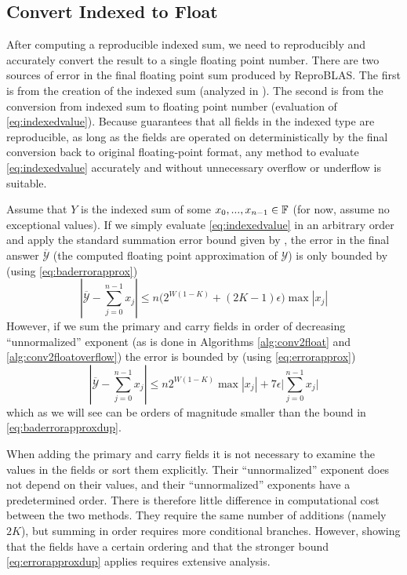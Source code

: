 \subsection{Convert Indexed to Float}
    \label{sec:primitiveops_conv2float}
    After computing a reproducible indexed sum, we need to reproducibly and
    accurately convert the result to a single floating point number. There
    are two sources of error in the final floating point sum
    produced by ReproBLAS. The first is from the creation of the indexed sum
    (analyzed in \cite{repsum}). The second is from the conversion from indexed
    sum to floating point number (evaluation of  \eqref{eq:indexedvalue}).
    Because \cite{repsum} guarantees that all fields in the indexed type are
    reproducible, as long as the fields are operated on deterministically
    by the final conversion back to original floating-point format,
    any method to evaluate  \eqref{eq:indexedvalue} accurately and without
    unnecessary overflow or underflow is suitable.

    Assume that $Y$ is the indexed sum of some $x_0, ..., x_{n - 1} \in \mathbb{F}$ (for now, assume no exceptional values). If
    we simply evaluate \eqref{eq:indexedvalue} in an arbitrary order and apply
    the standard summation error bound given by \cite{higham}, the error in the
    final answer $\overline{\mathcal{Y}}$ (the computed floating point
    approximation of $\mathcal{Y}$) is only bounded by (using
    \eqref{eq:baderrorapprox})
    \begin{equation}
      |\overline{\mathcal{Y}} - \sum_{j=0}^{n-1}x_j| \leq n \bigl(2^{W  (1 - K)} + (2  K - 1)  \epsilon\bigr)\max|x_j|
      \label{eq:baderrorapproxdup}
    \end{equation}
    However, if we sum the primary and carry fields in order of decreasing ``unnormalized''
    exponent (as is done in Algorithms \ref{alg:conv2float} and \ref{alg:conv2floatoverflow}) the error is bounded by (using  \eqref{eq:errorapprox})
    \begin{equation}
      |\overline{\mathcal{Y}} - \sum_{j=0}^{n-1}x_j| \leq n 2^{W  (1 - K)}\max|x_j|  + 7 \epsilon \bigl|\sum\limits_{j = 0}^{n - 1} x_j\bigr|
      \label{eq:errorapproxdup}
    \end{equation}
    which as we will see can be orders of magnitude smaller than the bound in \eqref{eq:baderrorapproxdup}.

    When adding the primary and carry fields it is not necessary to examine the values in the
    fields or sort them explicitly. Their ``unnormalized'' exponent does not
    depend on their values, and their ``unnormalized'' exponents have a
    predetermined order. There is therefore little difference in computational cost between the two methods. They require the same number of
    additions (namely $2 K$), but summing in order requires more conditional branches. However, showing that the
    fields have a certain ordering and that the stronger bound \eqref{eq:errorapproxdup} applies requires
    extensive analysis.

